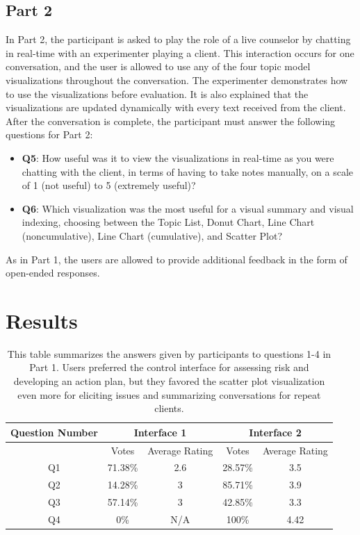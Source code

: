 \subsection{Part 2}

In Part 2, the participant is asked to play the role of a live counselor by chatting
in real-time with an experimenter playing a client. This interaction occurs for one
conversation, and the user is allowed to use any of the four topic model
visualizations throughout the conversation. The experimenter demonstrates how to use the
visualizations before evaluation. It is also explained that the visualizations are
updated dynamically with every text received from the client. After the conversation is
complete, the participant must answer the following questions for Part 2:
\begin{itemize}
  \item \textbf{Q5}: How useful was it to view the visualizations in real-time as you were
  chatting with the client, in terms of having to take notes manually, on a scale
  of 1 (not useful) to 5 (extremely useful)?
  \item \textbf{Q6}: Which visualization was the most useful for a visual summary and visual
  indexing, choosing between the Topic List, Donut Chart, Line Chart
  (noncumulative), Line Chart (cumulative), and Scatter Plot?
\end{itemize}
As in Part 1, the users are allowed to provide additional feedback in the form of
open-ended responses.

\section{Results}

\begin{table}[h]
  \centering
  \begin{tabular}{| c | c c | c c |}
    \hline
    Question Number & \multicolumn{2}{|c|}{Interface 1} & \multicolumn{2}{|c|}{Interface 2} \\
    \hline \hline
    & Votes & Average Rating & Votes & Average Rating \\
    \hline
    Q1 & 71.38\% & 2.6 & 28.57\% & 3.5 \\
    Q2 & 14.28\% & 3 & 85.71\% & 3.9 \\
    Q3 & 57.14\% & 3 & 42.85\% & 3.3 \\
    Q4 & 0\% & N/A & 100\% & 4.42 \\
    \hline
  \end{tabular}
  \caption{This table summarizes the answers given by participants to questions 1-4
  in Part 1. Users preferred the control interface for assessing risk and developing an
  action plan, but they favored the scatter plot visualization even more for eliciting
  issues and summarizing conversations for repeat clients.}
  \label{tab:results}
\end{table}

